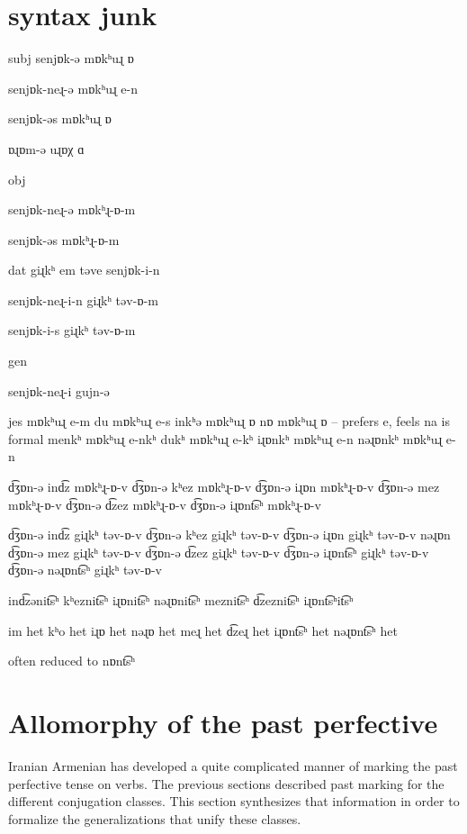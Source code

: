\section{syntax junk}
subj senjɒk-ə mɒkʰuɻ ɒ

senjɒk-neɻ-ə mɒkʰuɻ e-n

senjɒk-əs mɒkʰuɻ ɒ

ɒɻɒm-ə uɻɒχ ɑ

obj 

senjɒk-neɻ-ə mɒkʰɻ-ɒ-m

senjɒk-əs mɒkʰɻ-ɒ-m



dat giɻkʰ em təve senjɒk-i-n

senjɒk-neɻ-i-n giɻkʰ təv-ɒ-m

senjɒk-i-s giɻkʰ təv-ɒ-m


gen 

senjɒk-neɻ-i gujn-ə



jes mɒkʰuɻ e-m
du mɒkʰuɻ e-s
inkʰə mɒkʰuɻ ɒ
nɒ  mɒkʰuɻ ɒ -- prefers e, feels na is formal
menkʰ mɒkʰuɻ e-nkʰ
dukʰ mɒkʰuɻ e-kʰ
iɻɒnkʰ mɒkʰuɻ e-n
nəɻɒnkʰ mɒkʰuɻ e-n


d͡ʒɒn-ə in\t{dz} mɒkʰɻ-ɒ-v
d͡ʒɒn-ə kʰez mɒkʰɻ-ɒ-v
d͡ʒɒn-ə iɻɒn mɒkʰɻ-ɒ-v
d͡ʒɒn-ə mez mɒkʰɻ-ɒ-v
d͡ʒɒn-ə \t{dz}ez mɒkʰɻ-ɒ-v
d͡ʒɒn-ə iɻɒn\t{ts}ʰ mɒkʰɻ-ɒ-v

d͡ʒɒn-ə in\t{dz} giɻkʰ təv-ɒ-v
d͡ʒɒn-ə kʰez giɻkʰ təv-ɒ-v
d͡ʒɒn-ə iɻɒn giɻkʰ təv-ɒ-v
nəɻɒn
d͡ʒɒn-ə mez giɻkʰ təv-ɒ-v
d͡ʒɒn-ə \t{dz}ez giɻkʰ təv-ɒ-v
d͡ʒɒn-ə iɻɒn\t{ts}ʰ giɻkʰ təv-ɒ-v
d͡ʒɒn-ə nəɻɒn\t{ts}ʰ giɻkʰ təv-ɒ-v

in\t{dz}əni\t{ts}ʰ
kʰezni\t{ts}ʰ
iɻɒni\t{ts}ʰ
nəɻɒni\t{ts}ʰ
mezni\t{ts}ʰ
\t{dz}ezni\t{ts}ʰ
iɻɒn\t{ts}ʰi\t{ts}ʰ

im het
kʰo het
iɻɒ het
nəɻɒ het
meɻ het
\t{dz}eɻ het
iɻɒn\t{ts}ʰ het
nəɻɒn\t{ts}ʰ het

often reduced to nɒn\t{ts}ʰ

\section{Allomorphy of the past perfective}\label{section:verb:past}

Iranian Armenian has developed a quite complicated manner of marking the past  perfective tense on verbs. The previous sections described past marking for the different conjugation classes. This section synthesizes that information in order to formalize the generalizations that unify these classes.  

